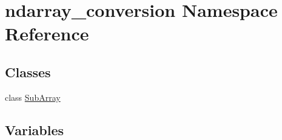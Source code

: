 \hypertarget{namespacendarray__conversion}{}\section{ndarray\+\_\+conversion Namespace Reference}
\label{namespacendarray__conversion}
\subsection*{Classes}
\begin{DoxyCompactItemize}
\item 
class \hyperlink{classndarray__conversion_1_1SubArray}{Sub\+Array}
\end{DoxyCompactItemize}
\subsection*{Variables}
